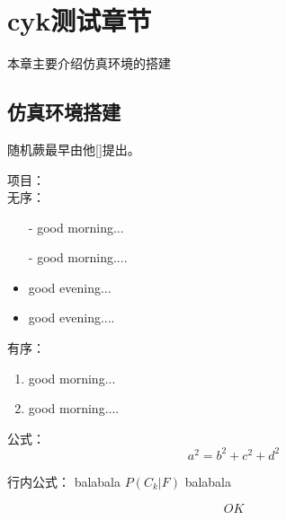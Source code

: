 \chapter{cyk测试章节}

本章主要介绍仿真环境的搭建

\section{仿真环境搭建}

随机蕨最早由他[]提出\cite{ozuysal2007fast}。

项目：\\
无序：
\begin{itemize}
\item[-] good morning...
\item[-] good morning....
\end{itemize}

\begin{itemize}
\item good evening...
\item good evening....
\end{itemize}

有序：
\begin{enumerate}
\item good morning...
\item good morning....
\end{enumerate}

公式：
\begin{equation}
	a^2=b^2+c^2+d^2
\end{equation}

行内公式：
balabala
$P(C_k|F)$
balabala


\begin{equation}
	OK
\end{equation}

